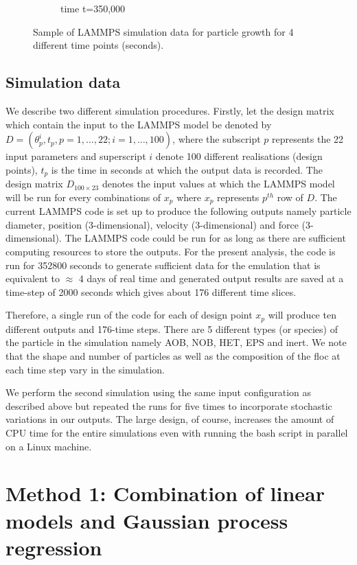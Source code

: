\documentclass[12pt,titlepage]{report}
\theoremstyle{definition}
\theoremstyle{remark}
\begin{document}
\begin{figure}[!ht]
\begin{subfigure}[b]{.5\textwidth}
\caption{time t=350,000}
\end{subfigure}\vspace*{-.1em}
\caption{Sample of LAMMPS simulation data for particle growth for 4 different time points (seconds).}\label{myfig1}
\end{figure}


\subsection{Simulation data}
We describe two different simulation procedures. Firstly, let the design matrix which contain the input to the LAMMPS model be denoted by $D=(\theta^i_p, t_p, p=1,\ldots,22; i=1,\ldots,100)$, where the subscript $p$ represents the 22 input parameters and superscript $i$ denote 100 different realisations (design points), $t_p$ is the time in seconds at which the output data is recorded. The design matrix $D_{100 \times 23}$ denotes the input values at which the LAMMPS model will be run for every combinations of $x_p$ where $x_p$ represents $p^{th}$ row of $D$. The current LAMMPS code is set up to produce the following outputs namely particle diameter, position (3-dimensional), velocity (3-dimensional) and force (3-dimensional). The LAMMPS code could be run for as long as there are sufficient computing resources to store the outputs. For the present analysis, the code is run for 352800 seconds to generate sufficient data for the emulation that is equivalent to $\approx$ 4 days of real time and generated output results are saved at a time-step of 2000 seconds which gives about 176 different time slices. 

Therefore, a single run of the code for each of design point $x_p$ will produce ten different outputs and 176-time steps. There are 5 different types (or species) of the particle in the simulation namely AOB, NOB, HET, EPS and inert. We note that the shape and number of particles as well as the composition of the floc at each time step vary in the simulation. 

We perform the second simulation using the same input configuration as described above but repeated the runs for five times to incorporate stochastic variations in our outputs. The large design, of course, increases the amount of CPU time for the entire simulations even with running the bash script in parallel on a Linux machine. 


\section{Method 1: Combination of linear models and Gaussian process regression}
\end{document}
